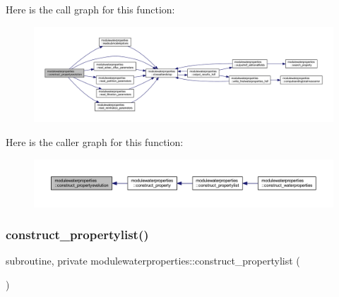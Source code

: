 Here is the call graph for this function\+:\nopagebreak
\begin{figure}[H]
\begin{center}
\leavevmode
\includegraphics[width=350pt]{namespacemodulewaterproperties_ac9ab6b0f5ee3c2470edaceaf1ef669a7_cgraph}
\end{center}
\end{figure}
Here is the caller graph for this function\+:\nopagebreak
\begin{figure}[H]
\begin{center}
\leavevmode
\includegraphics[width=350pt]{namespacemodulewaterproperties_ac9ab6b0f5ee3c2470edaceaf1ef669a7_icgraph}
\end{center}
\end{figure}
\mbox{\label{namespacemodulewaterproperties_a4eb6420a0cc772838269f9aed6c4394e}} 
\subsubsection{\texorpdfstring{construct\+\_\+propertylist()}{construct\_propertylist()}}
{\footnotesize\ttfamily subroutine, private modulewaterproperties\+::construct\+\_\+propertylist (\begin{DoxyParamCaption}{ }\end{DoxyParamCaption})\hspace{0.3cm}{\ttfamily [private]}}

